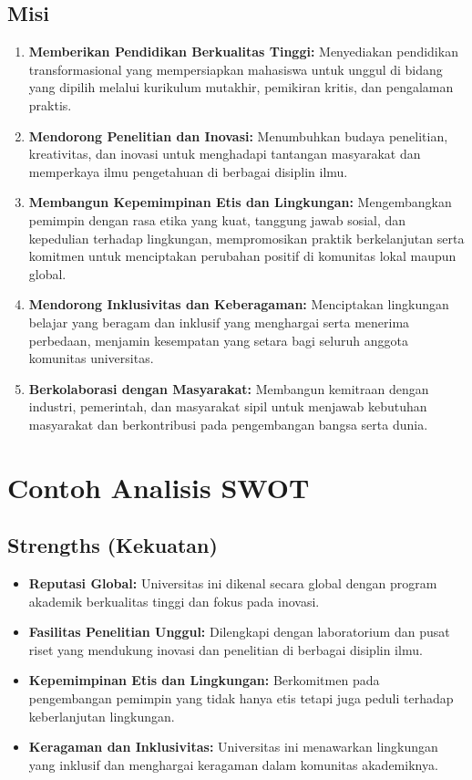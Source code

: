 \subsection{Misi}
\begin{enumerate}
	\item \textbf{Memberikan Pendidikan Berkualitas Tinggi:} Menyediakan pendidikan transformasional yang mempersiapkan mahasiswa untuk unggul di bidang yang dipilih melalui kurikulum mutakhir, pemikiran kritis, dan pengalaman praktis.
	
	\item \textbf{Mendorong Penelitian dan Inovasi:} Menumbuhkan budaya penelitian, kreativitas, dan inovasi untuk menghadapi tantangan masyarakat dan memperkaya ilmu pengetahuan di berbagai disiplin ilmu.
	
	\item \textbf{Membangun Kepemimpinan Etis dan Lingkungan:} Mengembangkan pemimpin dengan rasa etika yang kuat, tanggung jawab sosial, dan kepedulian terhadap lingkungan, mempromosikan praktik berkelanjutan serta komitmen untuk menciptakan perubahan positif di komunitas lokal maupun global.
	
	\item \textbf{Mendorong Inklusivitas dan Keberagaman:} Menciptakan lingkungan belajar yang beragam dan inklusif yang menghargai serta menerima perbedaan, menjamin kesempatan yang setara bagi seluruh anggota komunitas universitas.
	
	\item \textbf{Berkolaborasi dengan Masyarakat:} Membangun kemitraan dengan industri, pemerintah, dan masyarakat sipil untuk menjawab kebutuhan masyarakat dan berkontribusi pada pengembangan bangsa serta dunia.
\end{enumerate}

\section{Contoh Analisis SWOT}

\subsection{Strengths (Kekuatan)}
\begin{itemize}
	\item \textbf{Reputasi Global:} Universitas ini dikenal secara global dengan program akademik berkualitas tinggi dan fokus pada inovasi.
	\item \textbf{Fasilitas Penelitian Unggul:} Dilengkapi dengan laboratorium dan pusat riset yang mendukung inovasi dan penelitian di berbagai disiplin ilmu.
	\item \textbf{Kepemimpinan Etis dan Lingkungan:} Berkomitmen pada pengembangan pemimpin yang tidak hanya etis tetapi juga peduli terhadap keberlanjutan lingkungan.
	\item \textbf{Keragaman dan Inklusivitas:} Universitas ini menawarkan lingkungan yang inklusif dan menghargai keragaman dalam komunitas akademiknya.
\end{itemize}

